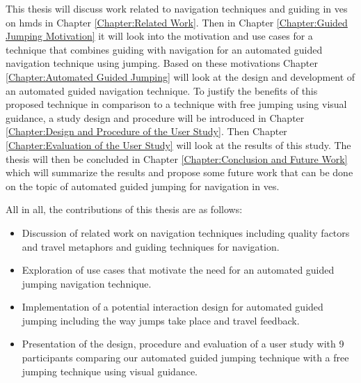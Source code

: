 This thesis will discuss work related to navigation techniques and guiding in \acrshort{ve}s on \acrfull{hmd}s in Chapter \ref{Chapter:Related Work}. Then in Chapter \ref{Chapter:Guided Jumping Motivation} it will look into the motivation and use cases for a technique that combines guiding with navigation for an automated guided navigation technique using jumping. Based on these motivations Chapter \ref{Chapter:Automated Guided Jumping} will look at the design and development of an automated guided navigation technique. To justify the benefits of this proposed technique in comparison to a technique with free jumping using visual guidance, a study design and procedure will be introduced in Chapter \ref{Chapter:Design and Procedure of the User Study}. Then Chapter \ref{Chapter:Evaluation of the User Study} will look at the results of this study. The thesis will then be concluded in Chapter \ref{Chapter:Conclusion and Future Work} which will summarize the results and propose some future work that can be done on the topic of automated guided jumping for navigation in \acrshort{ve}s.

All in all, the contributions of this thesis are as follows:
\begin{itemize}
	\item Discussion of related work on navigation techniques including quality factors and travel metaphors and guiding techniques for navigation.
	\item Exploration of use cases that motivate the need for an automated guided jumping navigation technique.
	\item Implementation of a potential interaction design for automated guided jumping including the way jumps take place and travel feedback.
	\item Presentation of the design, procedure and evaluation of a user study with 9 participants comparing our automated guided jumping technique with a free jumping technique using visual guidance.
\end{itemize}
